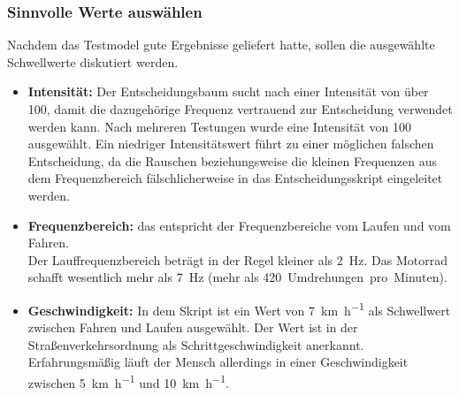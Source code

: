 %
%




\subsubsection{Sinnvolle Werte auswählen}
Nachdem das Testmodel gute Ergebnisse geliefert hatte, sollen die ausgewählte Schwellwerte diskutiert werden.
\begin{itemize}
	\item \textbf{Intensität:} Der Entscheidungsbaum sucht nach einer Intensität von über 100, damit die dazugehörige Frequenz vertrauend zur Entscheidung verwendet werden kann. Nach mehreren Testungen wurde eine Intensität von 100 ausgewählt. Ein niedriger Intensitätswert führt zu einer möglichen falschen Entscheidung, da die Rauschen beziehungsweise die kleinen Frequenzen aus dem Frequenzbereich fälschlicherweise in das Entscheidungsskript eingeleitet werden.
	\item \textbf{Frequenzbereich:} das entspricht der Frequenzbereiche vom Laufen und vom Fahren.\\
	Der Lauffrequenzbereich beträgt in der Regel kleiner als \SI{2}{\hertz}. Das Motorrad schafft wesentlich mehr als \SI{7}{\hertz} (mehr als \SI{420}{Umdrehungen pro Minuten}). 
	\item \textbf{Geschwindigkeit:} In dem Skript ist ein Wert von \SI[per-mode = symbol]{7}{\kilo\meter\per\hour} als Schwellwert zwischen Fahren und Laufen ausgewählt. Der Wert ist in der Straßenverkehrsordnung als Schrittgeschwindigkeit anerkannt\citep{Bussgeldkataloge2022}. Erfahrungsmäßig läuft der Mensch allerdings in einer Geschwindigkeit zwischen \SI[per-mode = symbol]{5}{\kilo\meter\per\hour} und \SI[per-mode = symbol]{10}{\kilo\meter\per\hour}.
\end{itemize}



